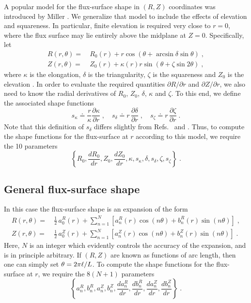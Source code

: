 A popular model for the flux-surface shape in $(R,Z)$
coordinates was introduced by Miller \cite{miller:1998}.  We 
generalize that model to include the effects of elevation 
and squareness.  In particular, finite elevation is required 
very close to $r=0$, where the flux surface may lie entirely 
above the midplane at $Z=0$.  Specifically, let
%
\begin{align}
R(r,\theta) = &~R_0(r) 
 + r \cos(\theta + \arcsin\delta \sin\theta) \; , \\
Z(r,\theta) = &~Z_0(r) 
 + \kappa(r) r \sin(\theta + \zeta \sin 2\theta) \; ,
\end{align}
%
where $\kappa$ is the elongation, $\delta$ is the triangularity, 
$\zeta$ is the squareness and $Z_0$ is the elevation \cite{turnbull:1999}.
In order to evaluate the required quantities 
$\partial R/\partial r$ and $\partial Z/\partial r$, we 
also need to know the radial derivatives of $R_0$, $Z_0$, 
$\delta$, $\kappa$ and $\zeta$.  To this end, we define 
the associated shape functions 
%
\begin{equation}
s_\kappa \doteq \frac{r}{\kappa} \frac{\partial\kappa}{\partial r} \; , \quad
s_\delta \doteq r \, \frac{\partial\delta}{\partial r} \; , \quad
s_\zeta \doteq r \, \frac{\partial\zeta}{\partial r} \; .
\end{equation} 
% 
Note that this definition of $s_\delta$ differs slightly from 
Refs.~\cite{miller:1998} and \cite{waltz:1999}.
Thus, to compute the shape functions for the flux-surface at 
$r$ according to this model, we require the 10 parameters
%
\begin{equation}
\left\{R_0,\frac{dR_0}{dr},Z_0,\frac{dZ_0}{dr},
\kappa,s_\kappa,\delta,s_\delta,\zeta,s_\zeta\right\} \; .
\end{equation}

\subsection{General flux-surface shape}

In this case the flux-surface shape is an expansion of the form
%
\begin{align}
R(r,\theta) = &~\frac{1}{2} \, a^R_0(r) + \sum_{n=1}^N 
 \left[ a^R_n(r) \cos(n\theta) + b^R_n(r) \sin(n\theta) \right] \; , \\
Z(r,\theta) = &~\frac{1}{2} \, a^Z_0(r) + \sum_{n=1}^N 
 \left[ a^Z_n(r) \cos(n\theta) + b^Z_n(r) \sin(n\theta) \right] \; .
\end{align}
%
Here, $N$ is an integer which evidently controls the 
accuracy of the expansion, and is in principle arbitrary.
If $(R,Z)$ are known as functions of arc length, then one
can simply set $\theta = 2\pi \ell/L$.
To compute the shape functions for the flux-surface at $r$, 
we require the $8(N+1)$ parameters
%
\begin{equation}
\left\{a^R_n,b^R_n,a^Z_n,b^Z_n,
\frac{da^R_n}{dr},\frac{db^R_n}{dr},
\frac{da^Z_n}{dr},\frac{db^Z_n}{dr}\right\} \; .
\end{equation}

